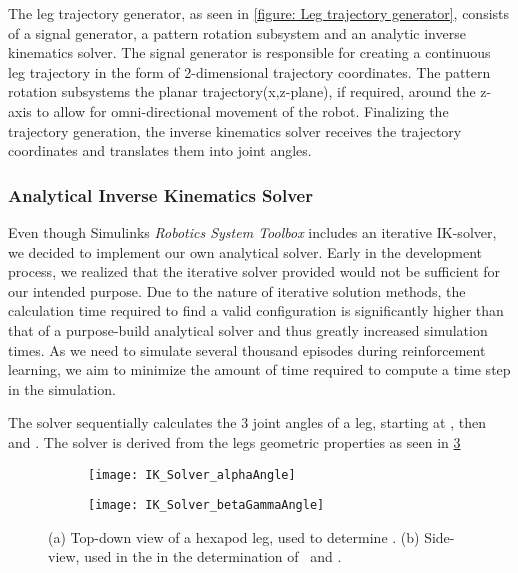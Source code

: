 The leg trajectory generator, as seen in \ref{figure: Leg trajectory generator}, consists of a signal generator, a pattern rotation subsystem and an analytic inverse kinematics solver.
The signal generator is responsible for creating a continuous leg trajectory in the form of 2-dimensional trajectory coordinates.
The pattern rotation subsystems the planar trajectory(x,z-plane), if required, around the z-axis to allow for omni-directional movement of the robot.
Finalizing the trajectory generation, the inverse kinematics solver receives the trajectory coordinates and translates them into joint angles.


\subsubsection{Analytical Inverse Kinematics Solver} \label{subsubsec: IK Solver}
Even though Simulinks \textit{Robotics System Toolbox} includes an iterative IK-solver, we decided to implement our own analytical solver.
Early in the development process, we realized that the iterative solver provided would not be sufficient for our intended purpose.
Due to the nature of iterative solution methods, the calculation time required to find a valid configuration is significantly higher than that of a purpose-build analytical solver and thus greatly increased simulation times.
As we need to simulate several thousand episodes during reinforcement learning, we aim to minimize the 
amount of time required to compute a time step in the simulation.

The solver sequentially calculates the 3 joint angles of a leg, starting at \textalpha, then \textbeta and \textgamma.
The solver is derived from the legs geometric properties as seen in \ref{figure: IK angle derivations}

\begin{figure}[h]
	\begin{subfigure}{.5\textwidth} %
		\centering
		\texttt{[image: IK\_Solver\_alphaAngle]}  %
		\caption{}
		\label{figure: IK Solver Alpha Angle}
	\end{subfigure}
	\begin{subfigure}{.5\textwidth}
		\centering
		\texttt{[image: IK\_Solver\_betaGammaAngle]}  
		\caption{}
		\label{figure: IK Solver Beta/Gamma Angle}
	\end{subfigure}
	\caption[Angle derivation drawings]{(a) Top-down view of a hexapod leg, used to determine \textalpha. (b) Side-view, used in the in the determination of \textbeta \ and \textgamma.}
	\label{figure: IK angle derivations}
\end{figure}


